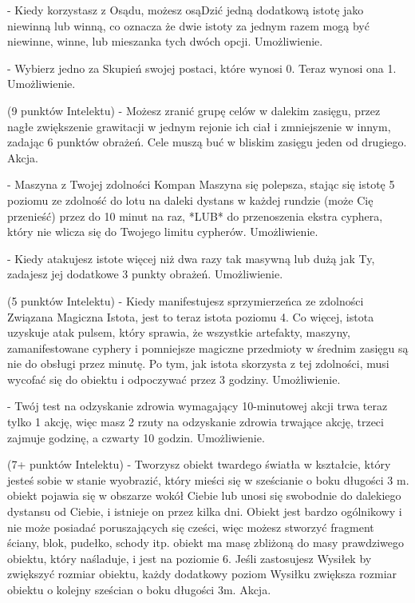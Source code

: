{ - Kiedy korzystasz z Osądu, możesz osąDzić jedną dodatkową istotę jako niewinną lub winną, co oznacza że dwie istoty za jednym razem mogą być niewinne, winne, lub mieszanka tych dwóch opcji. Umożliwienie. 

 - Wybierz jedno za Skupień swojej postaci, które wynosi 0. Teraz wynosi ona 1. Umożliwienie.

 (9 punktów Intelektu) - Możesz zranić grupę celów w dalekim zasięgu, przez nagłe zwiększenie grawitacji w jednym rejonie ich ciał i zmniejszenie w innym, zadając 6 punktów obrażeń. Cele muszą buć w bliskim zasięgu jeden od drugiego. Akcja.

 - Maszyna z Twojej zdolności Kompan Maszyna się polepsza, stając się istotę 5 poziomu ze zdolność do lotu na daleki dystans w każdej rundzie (może Cię przenieść) przez do 10 minut na raz, *LUB* do przenoszenia ekstra cyphera, który nie wlicza się do Twojego limitu cypherów. Umożliwienie. 

 - Kiedy atakujesz istote więcej niż dwa razy tak masywną lub dużą jak Ty, zadajesz jej dodatkowe 3 punkty obrażeń. Umożliwienie. 

 (5 punktów Intelektu) - Kiedy manifestujesz sprzymierzeńca ze zdolności Związana Magiczna Istota, jest to teraz istota poziomu 4. Co więcej, istota uzyskuje atak pulsem, który sprawia, że wszystkie artefakty, maszyny, zamanifestowane cyphery i pomniejsze magiczne przedmioty w średnim zasięgu są nie do obsługi przez minutę. Po tym, jak istota skorzysta z tej zdolności, musi wycofać się do obiektu i odpoczywać przez 3 godziny. Umożliwienie.

 - Twój test na odzyskanie zdrowia wymagający 10-minutowej akcji trwa teraz tylko 1 akcję, więc masz 2 rzuty na odzyskanie zdrowia trwające akcję, trzeci zajmuje godzinę, a czwarty 10 godzin. Umożliwienie.

 (7+ punktów Intelektu) - Tworzysz obiekt twardego światła w kształcie, który jesteś sobie w stanie wyobrazić, który mieści się w sześcianie o boku długości 3 m. obiekt pojawia się w obszarze wokół Ciebie lub unosi się swobodnie do dalekiego dystansu od Ciebie, i istnieje on przez kilka dni. Obiekt jest bardzo ogólnikowy i nie może posiadać poruszających się cześci, więc możesz stworzyć fragment ściany, blok, pudełko, schody itp. obiekt ma masę zbliżoną do masy prawdziwego obiektu, który naśladuje, i jest na poziomie 6. Jeśli zastosujesz Wysiłek by zwiększyć rozmiar obiektu, każdy dodatkowy poziom Wysiłku zwiększa rozmiar obiektu o kolejny sześcian o boku długości 3m. Akcja.

}
